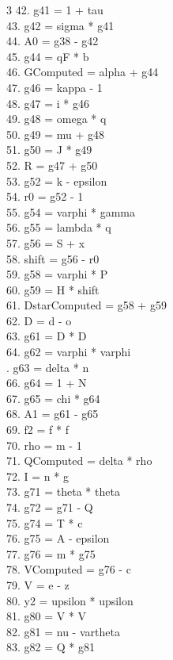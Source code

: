 \documentclass[10pt]{article}
\begin{document}
\begin{multicols}{3}
42. g41 = 1 + tau\\
43. g42 = sigma * g41\\
44. A0 = g38 - g42\\
45. g44 = qF * b\\
46. GComputed = alpha + g44\\
47. g46 = kappa - 1\\
48. g47 = i * g46\\
49. g48 = omega * q\\
50. g49 = mu + g48\\
51. g50 = J * g49\\
52. R = g47 + g50\\
53. g52 = k - epsilon\\
54. r0 = g52 - 1\\
55. g54 = varphi * gamma\\
56. g55 = lambda * q\\
57. g56 = S + x\\
58. shift = g56 - r0\\
59. g58 = varphi * P\\
60. g59 = H * shift\\
61. DstarComputed = g58 + g59\\
62. D = d - o\\
63. g61 = D * D\\
64. g62 = varphi * varphi\\
. g63 = delta * n\\
66. g64 = 1 + N\\
67. g65 = chi * g64\\
68. A1 = g61 - g65\\
69. f2 = f * f\\
70. rho = m - 1\\
71. QComputed = delta * rho\\
72. I = n * g\\
73. g71 = theta * theta\\
74. g72 = g71 - Q\\
75. g74 = T * c\\
76. g75 = A - epsilon\\
77. g76 = m * g75\\
78. VComputed = g76 - c\\
79. V = e - z\\
80. y2 = upsilon * upsilon\\
81. g80 = V * V\\
82. g81 = nu - vartheta\\
83. g82 = Q * g81\\

\end{multicols}
\end{document}

